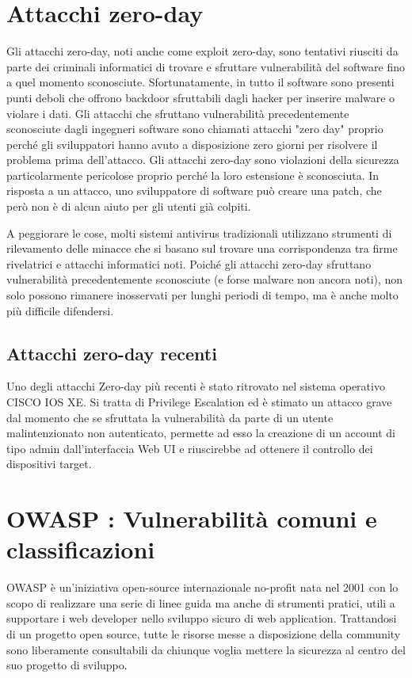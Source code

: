 \section{Attacchi zero-day}
Gli attacchi zero-day, noti anche come exploit zero-day, sono tentativi riusciti da parte dei criminali informatici di trovare e sfruttare vulnerabilità del software fino a quel momento sconosciute. Sfortunatamente, in tutto il software sono presenti punti deboli che offrono backdoor sfruttabili dagli hacker per inserire malware o violare i dati. Gli attacchi che sfruttano vulnerabilità precedentemente sconosciute dagli ingegneri software sono chiamati attacchi "zero day" proprio perché gli sviluppatori hanno avuto a disposizione zero giorni per risolvere il problema prima dell'attacco.
Gli attacchi zero-day sono violazioni della sicurezza particolarmente pericolose proprio perché la loro estensione è sconosciuta. In risposta a un attacco, uno sviluppatore di software può creare una patch, che però non è di alcun aiuto per gli utenti già colpiti.

A peggiorare le cose, molti sistemi antivirus tradizionali utilizzano strumenti di rilevamento delle minacce che si basano sul trovare una corrispondenza tra firme rivelatrici e attacchi informatici noti. Poiché gli attacchi zero-day sfruttano vulnerabilità precedentemente sconosciute (e forse malware non ancora noti), non solo possono rimanere inosservati per lunghi periodi di tempo, ma è anche molto più difficile difendersi.
\cite{attaccoZeroDay}
\subsection{Attacchi zero-day recenti}
Uno degli attacchi Zero-day più recenti è stato ritrovato nel sistema operativo CISCO IOS XE. Si tratta di Privilege Escalation ed è stimato un attacco grave dal momento che se sfruttata la vulnerabilità da parte di un utente malintenzionato non autenticato, permette ad esso la creazione di un account di tipo admin dall’interfaccia Web UI e riuscirebbe ad ottenere il controllo dei dispositivi target.
\cite{attaccoZeroDayRecente}
\section{OWASP : Vulnerabilità comuni e  classificazioni} 

OWASP è un’iniziativa open-source internazionale no-profit nata nel 2001 con lo scopo di realizzare una serie di linee guida ma anche di strumenti pratici, utili a supportare i web developer nello sviluppo sicuro di web application.
Trattandosi di un progetto open source, tutte le risorse messe a disposizione della community sono liberamente consultabili da chiunque voglia mettere la sicurezza al centro del suo progetto di sviluppo.


